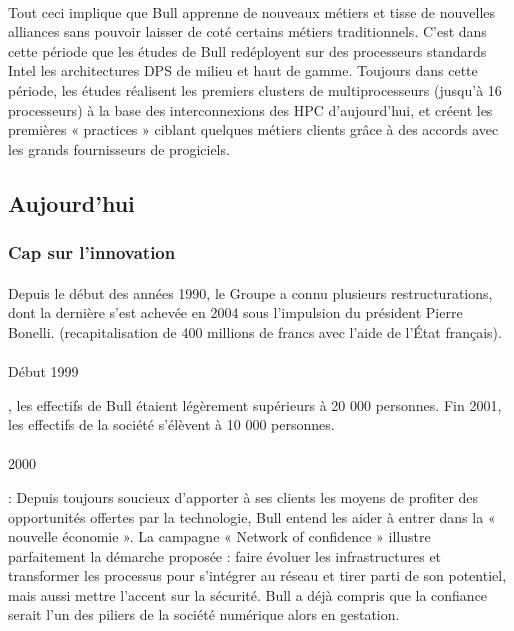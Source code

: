 \documentclass{article}
\begin{document}
		\paragraph{}
		Tout ceci implique que Bull apprenne de nouveaux métiers et tisse de nouvelles alliances sans pouvoir laisser de coté 
		certains métiers traditionnels. C’est dans cette période que les études de Bull redéployent sur des processeurs 
		standards Intel les architectures DPS de milieu et haut de gamme. Toujours dans cette période, les études réalisent 
		les premiers clusters de multiprocesseurs (jusqu’à 16 processeurs) à la base des interconnexions des HPC d’aujourd’hui, 
		et créent les premières « practices » ciblant quelques métiers clients grâce à des accords avec les grands fournisseurs 
		de progiciels. 
		\subsection{Aujourd'hui}
		\subsubsection{Cap sur l'innovation}
		\paragraph{}
		Depuis le début des années 1990, le Groupe a connu plusieurs restructurations, dont la dernière s'est achevée en 2004 
		sous l’impulsion du président Pierre Bonelli. (recapitalisation de 400 millions de francs avec l'aide de l'État français).
		\paragraph{}
		\begin{bf}Début 1999\end{bf}, les effectifs de Bull étaient légèrement supérieurs à 20 000 personnes. Fin 2001, 
		les effectifs de la société s’élèvent à 10 000 personnes.
		\paragraph{}
		\begin{bf}2000\end{bf} : Depuis toujours soucieux d’apporter à ses clients les moyens de profiter des opportunités 
		offertes par la technologie, Bull entend les aider à entrer dans la « nouvelle économie ». La campagne 
		« Network of confidence » illustre parfaitement la démarche proposée : faire évoluer les infrastructures et transformer 
		les processus pour s’intégrer au réseau et tirer parti de son potentiel, mais aussi mettre l’accent sur la sécurité. 
		Bull a déjà compris que la confiance serait l’un des piliers de la société numérique alors en gestation.
\end{document}
